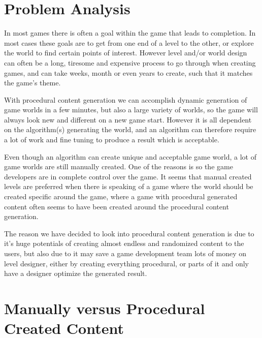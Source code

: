 \label{ProblemAnalysis}
\section{Problem Analysis}

In most games there is often a goal within the game that leads to completion. In most cases these goals are to get from one end of a level to the other, or explore the world to find certain points of interest. However level and/or world design can often be a long, tiresome and expensive process to go through when creating games, and can take weeks, month or even years to create, such that it matches the game's theme.

With procedural content generation we can accomplish dynamic generation of game worlds in a few minutes, but also a large variety of worlds, so the game will always look new and different on a new game start. However it is all dependent on the algorithm(s) generating the world, and an algorithm can therefore require a lot of work and fine tuning to produce a result which is acceptable.

Even though an algorithm can create unique and acceptable game world, a lot of game worlds are still manually created. One of the reasons is so the game developers are in complete control over the game. It seems that manual created levels are preferred when there is speaking of a game where the world should be created specific around the game, where a game with procedural generated content often seems to have been created around the procedural content generation.

The reason we have decided to look into procedural content generation is due to it's huge potentials of creating almost endless and randomized content to the users, but also due to it may save a game development team lots of money on level designer, either by creating everything procedural, or parts of it and only have a designer optimize the generated result.

\section{Manually versus Procedural Created Content}

